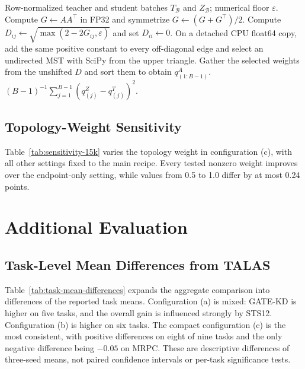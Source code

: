 \begin{algorithm}[H]
\caption{Native-space $H_0$ connectivity-scale loss for one minibatch}
\label{alg:h0-loss}
\begin{algorithmic}[1]
\Require Row-normalized teacher and student batches $T_{\mathcal B}$ and
$Z_{\mathcal B}$; numerical floor $\varepsilon$.
    \State Compute $G\gets AA^\top$ in FP32 and symmetrize
    $G\gets(G+G^\top)/2$.
    \State Compute $D_{ij}\gets\sqrt{\max(2-2G_{ij},\varepsilon)}$ and set
    $D_{ii}\gets0$.
    \State On a detached CPU float64 copy, add the same positive constant to
    every off-diagonal edge and select an undirected MST with SciPy from the
    upper triangle.
    \State Gather the selected weights from the unshifted $D$ and sort them to
    obtain $q^A_{(1:B-1)}$.
\EndFor
\State \Return $(B-1)^{-1}\sum_{j=1}^{B-1}(q^Z_{(j)}-q^T_{(j)})^2$.
\end{algorithmic}
\end{algorithm}

\FloatBarrier
\subsection{Topology-Weight Sensitivity}
\label{app:topology-sensitivity}

Table~\ref{tab:sensitivity-15k} varies the topology weight in configuration
(c), with all other settings fixed to the main recipe. Every tested nonzero
weight improves over the endpoint-only setting, while values from 0.5 to 1.0
differ by at most 0.24 points.



\FloatBarrier
\section{Additional Evaluation}
\label{app:additional-evaluation}

\subsection{Task-Level Mean Differences from TALAS}
\label{app:task-mean-differences}

Table~\ref{tab:task-mean-differences} expands the aggregate comparison into
differences of the reported task means. Configuration (a) is mixed: GATE-KD is
higher on five tasks, and the overall gain is influenced strongly by STS12.
Configuration (b) is higher on six tasks. The compact configuration (c) is the
most consistent, with positive differences on eight of nine tasks and the only
negative difference being $-0.05$ on MRPC. These are descriptive differences
of three-seed means, not paired confidence intervals or per-task significance
tests.

